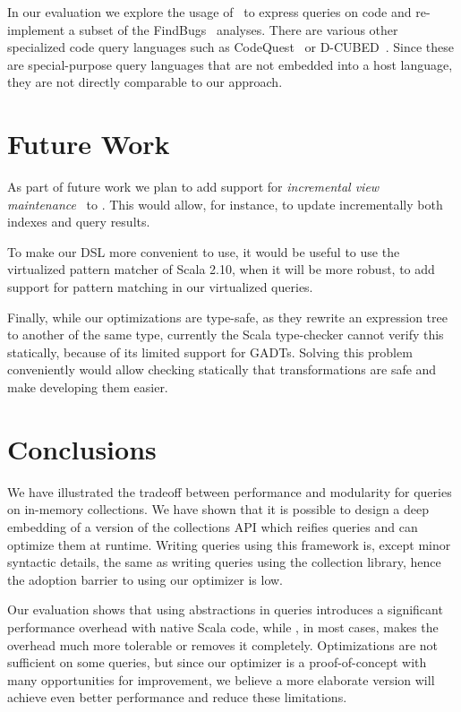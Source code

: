 In our evaluation we explore the usage of \LoS\ to express queries on code and re-implement a subset of the FindBugs~\citep{DBLP:journals/sigplan/HovemeyerP04} analyses. There are various other specialized code query languages such as 
CodeQuest~\citep{Hajiyev06CodeQuest} or D-CUBED~\citep{Wegrzynowicz:2009:GBU:1639950.1640032}. 
Since these are special-purpose query languages that are not embedded into a host language, they are not directly comparable to our approach.



\section{Future Work}
As part of future work we plan to add support for \emph{incremental view
maintenance}~\citep{GlucheGrust97Incr} to \LoS. This would allow, for instance,
to update incrementally both indexes and query results.

To make our DSL more convenient to use, it would be useful to use the
virtualized pattern matcher of Scala 2.10, when it will be more robust, to add
support for pattern matching in our virtualized queries.

Finally, while our optimizations are type-safe, as they rewrite an expression
tree to another of the same type, currently the Scala
type-checker cannot verify this statically, because of its limited support for
GADTs.
Solving this problem conveniently would allow checking statically that
transformations are safe and make developing them easier.

\section{Conclusions}

We have illustrated the tradeoff between performance and modularity for queries on in-memory collections. We have shown that it is possible to design a deep embedding of a version of the collections API which reifies queries and can optimize them at runtime.
Writing queries using this framework is, except minor syntactic details, the same as writing queries using the collection library, hence the adoption barrier to using our optimizer is low. 

Our evaluation shows that using abstractions in queries introduces a significant
performance overhead with native Scala code, while \LoS{}, in most cases, makes
the overhead much more tolerable or removes it completely. Optimizations are not
sufficient on some queries, but since our optimizer is a proof-of-concept with
many opportunities for improvement, we believe a more elaborate version will
achieve even better performance and reduce these limitations.


